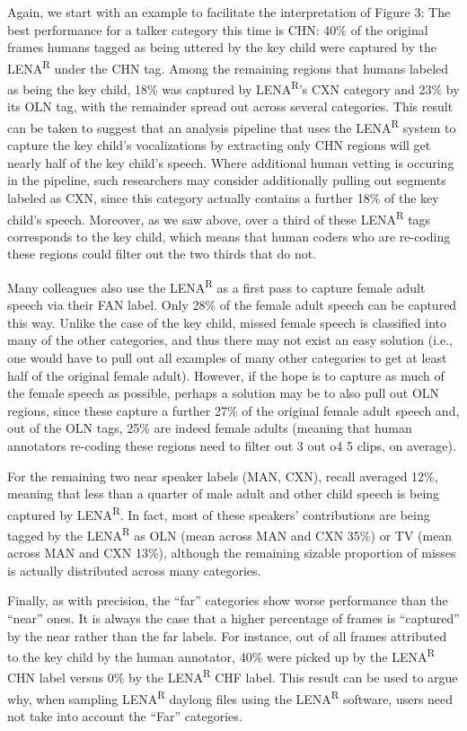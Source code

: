 \documentclass[english,table,man,floatsintext]{apa6}
\begin{document}
Again, we start with an example to facilitate the interpretation of Figure 3: The best performance for a talker category this time is CHN: 40\% of the original frames humans tagged as being uttered by the key child were captured by the LENA\textsuperscript{R} under the CHN tag. Among the remaining regions that humans labeled as being the key child, 18\% was captured by LENA\textsuperscript{R}'s CXN category and 23\% by its OLN tag, with the remainder spread out across several categories. This result can be taken to suggest that an analysis pipeline that uses the LENA\textsuperscript{R} system to capture the key child's vocalizations by extracting only CHN regions will get nearly half of the key child's speech. Where additional human vetting is occuring in the pipeline, such researchers may consider additionally pulling out segments labeled as CXN, since this category actually contains a further 18\% of the key child's speech. Moreover, as we saw above, over a third of these LENA\textsuperscript{R} tags corresponds to the key child, which means that human coders who are re-coding these regions could filter out the two thirds that do not.

Many colleagues also use the LENA\textsuperscript{R} as a first pass to capture female adult speech via their FAN label. Only 28\% of the female adult speech can be captured this way. Unlike the case of the key child, missed female speech is classified into many of the other categories, and thus there may not exist an easy solution (i.e., one would have to pull out all examples of many other categories to get at least half of the original female adult). However, if the hope is to capture as much of the female speech as possible, perhaps a solution may be to also pull out OLN regions, since these capture a further 27\% of the original female adult speech and, out of the OLN tags, 25\% are indeed female adults (meaning that human annotators re-coding these regions need to filter out 3 out o4 5 clips, on average).

For the remaining two near speaker labels (MAN, CXN), recall averaged 12\%, meaning that less than a quarter of male adult and other child speech is being captured by LENA\textsuperscript{R}. In fact, most of these speakers' contributions are being tagged by the LENA\textsuperscript{R} as OLN (mean across MAN and CXN 35\%) or TV (mean across MAN and CXN 13\%), although the remaining sizable proportion of misses is actually distributed across many categories.

Finally, as with precision, the \enquote{far} categories show worse performance than the \enquote{near} ones. It is always the case that a higher percentage of frames is \enquote{captured} by the near rather than the far labels. For instance, out of all frames attributed to the key child by the human annotator, 40\% were picked up by the LENA\textsuperscript{R} CHN label versus 0\% by the LENA\textsuperscript{R} CHF label. This result can be used to argue why, when sampling LENA\textsuperscript{R} daylong files using the LENA\textsuperscript{R} software, users need not take into account the \enquote{Far} categories.
\end{document}
